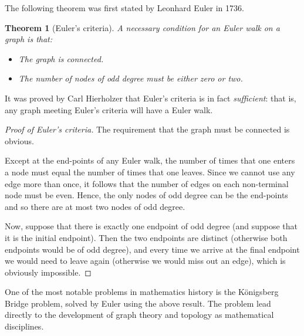 \documentclass[a4paper]{amsart}
\newtheorem{thm}{Theorem}[section]
\theoremstyle{definition}
\theoremstyle{remark}
\begin{document}
The following theorem was first stated by Leonhard Euler in 1736.

\begin{thm}[Euler's criteria]
  A \textit{necessary} condition for an Euler walk on a graph is that:
  \begin{itemize}
    \item The graph is connected.
    \item The number of nodes of odd degree must be either zero or two.
  \end{itemize}
\end{thm}

It was proved by Carl Hierholzer that Euler's criteria is in fact \textit{sufficient}: that is, any graph meeting Euler's criteria will have a Euler walk.

\begin{proof}[Proof of Euler's criteria]
  The requirement that the graph must be connected is obvious.

  Except at the end-points of any Euler walk, the number of times that one enters a node must equal the number of times that
  one leaves. Since we cannot use any edge more than once, it follows that the number of edges on each non-terminal
  node must be even. Hence, the only nodes of odd degree can be the end-points and so there are at most two nodes of odd degree.

  Now, suppose that there is exactly one endpoint of odd degree (and suppose that it is the initial endpoint). Then the two endpoints
  are distinct (otherwise both endpoints would be of odd degree), and every time we arrive at the final endpoint we would need to leave
  again (otherwise we would miss out an edge), which is obviously impossible.
\end{proof}

One of the most notable problems in mathematics history is the K\"onigsberg Bridge problem, solved by Euler using the above
result. The problem lead directly to the development of graph theory and topology as mathematical disciplines.
\end{document}
